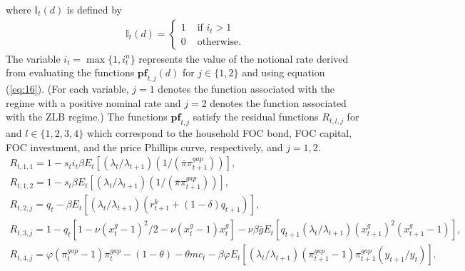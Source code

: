 \documentclass[12pt, final]{article}
\begin{document}
where $\mathds{I}_t(d)$ is defined by
\begin{gather}
    \label{eq:19}
  \mathds{I}_t(d) = 
\begin{cases}
     1 &\text{ if } i_t > 1\\
     0 &\text{ otherwise.}
\end{cases}
\end{gather}
The variable $i_t=\max\{1,i_t^n\}$ represents the value of the notional rate derived from evaluating the functions $\textbf{pf}_{t,j}(d)$ for $j \in \{1,2\}$ and using equation (\ref{eq:16}). (For each variable, $j=1$ denotes the function associated with the regime with a positive nominal rate and $j=2$ denotes the function associated with the ZLB regime.) %
The functions $\textbf{pf}_{t,j}$ satisfy the residual functions $R_{t,l,j}$ for and $l \in \{1,2,3,4\}$ which correspond to the household FOC bond, FOC capital, FOC investment, and the price Phillips curve, respectively, and $j = 1,2$.
\begin{gather}
\label{eq:20}
  R_{t,1,1} = 1 - s_ti_t\beta E_t[(\lambda_t/\lambda_{t+1})(1/(\bar{\pi}\pi_{t+1}^{gap}))],\\
\label{eq:21}
  R_{t,1,2} = 1 - s_t\beta E_t[(\lambda_t/\lambda_{t+1})(1/(\bar{\pi}\pi_{t+1}^{gap}))],\\
\label{eq:22}
  R_{t,2,j} = q_t - \beta E_t[(\lambda_t/\lambda_{t+1})(r^k_{t+1}+(1-\delta)q_{t+1})],\\
\label{eq:23}
  R_{t,3,j} = 1 - q_t[1-\nu(x^g_t-1)^2/2 - \nu(x_t^g-1)x_t^g] - \nu\beta\bar{g}E_t[q_{t+1}(\lambda_t/\lambda_{t+1})(x^g_{t+1})^2(x^g_{t+1}-1)],\\
\label{eq:24}
  R_{t,4,j} = \varphi(\pi_t^{gap}-1)\pi_t^{gap} - (1-\theta) - \theta mc_t - \beta\varphi E_t[(\lambda_t/\lambda_{t+1})(\pi_{t+1}^{gap}-1)\pi_{t+1}^{gap}(y_{t+1}/y_t)].
  \end{gather}
\end{document}
